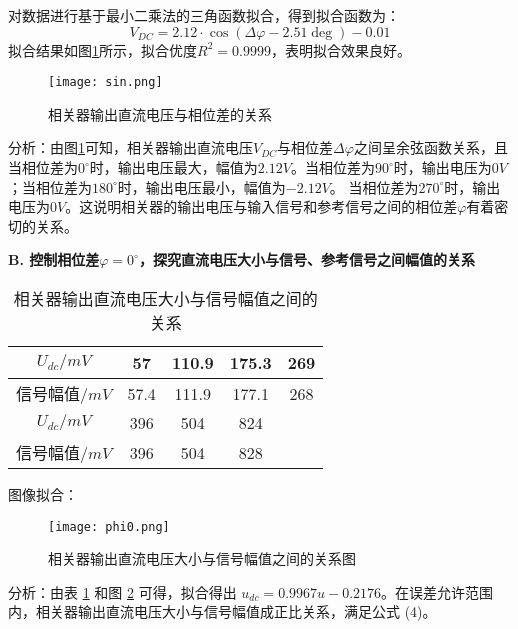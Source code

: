\documentclass{whureport}
\begin{document}
\begin{multicols}{2}
对数据进行基于最小二乘法的三角函数拟合，得到拟合函数为：
\begin{equation}
	V_{DC} = 2.12 \cdot \cos(\Delta \varphi - 2.51 \deg) - 0.01
\end{equation}
拟合结果如图\ref{fit}所示，拟合优度$R^2 = 0.9999$，表明拟合效果良好。
\begin{figure}[H]
	\centering
	\texttt{[image: sin.png]}
	\caption{相关器输出直流电压与相位差的关系}	
	\label{fit}
\end{figure}
分析：由图\ref{fit}可知，相关器输出直流电压$V_{DC}$与相位差$\Delta \varphi$之间呈余弦函数关系，且当相位差为$0^\circ$时，输出电压最大，幅值为$2.12V$。当相位差为$90^\circ$时，输出电压为$0V$；当相位差为$180^\circ$时，输出电压最小，幅值为$-2.12V$。
当相位差为$270^\circ$时，输出电压为$0V$。这说明相关器的输出电压与输入信号和参考信号之间的相位差$\varphi$有着密切的关系。

\textbf{B. 控制相位差$\varphi = 0^\circ$，探究直流电压大小与信号、参考信号之间幅值的关系}

\begin{table}[H]
    \centering
    \caption{相关器输出直流电压大小与信号幅值之间的关系}
    \begin{tabular}{c|cccc}
        \toprule
        $U_{dc}/\si{mV}$ & 57 & 110.9 & 175.3 & 269  \\
        \midrule
        信号幅值$/\si{mV}$ & 57.4 & 111.9 & 177.1 & 268  \\
		\midrule
		$U_{dc}/\si{mV}$ & 396 & 504 & 824 & \\
        \midrule
        信号幅值$/\si{mV}$  & 396 & 504 & 828 & \\
        \bottomrule
    \end{tabular}
	\label{table:dc}
\end{table}

图像拟合：

\begin{figure}[H]
    \centering
    \texttt{[image: phi0.png]}
    \caption{相关器输出直流电压大小与信号幅值之间的关系图}
	\label{fig:input}
\end{figure}

分析：由表 \ref{table:dc} 和图 \ref{fig:input} 可得，拟合得出 $u_{dc} = 0.9967u - 0.2176$。在误差允许范围内，相关器输出直流电压大小与信号幅值成正比关系，满足公式 (4)。



\printbibliography
\end{multicols}
\end{document}
